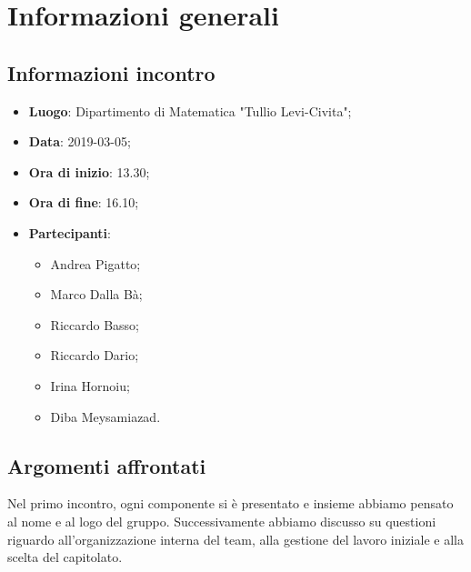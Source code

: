 \section{Informazioni generali}

\subsection{Informazioni incontro}
\begin{itemize}
\item \textbf{Luogo}: Dipartimento di Matematica "Tullio Levi-Civita";
\item \textbf{Data}: 2019-03-05;
\item \textbf{Ora di inizio}: 13.30;
\item \textbf{Ora di fine}: 16.10;
\item \textbf{Partecipanti}: 
\begin{itemize}
	\item Andrea Pigatto;
	\item Marco Dalla Bà;
	\item Riccardo Basso;
	\item Riccardo Dario;
	\item Irina Hornoiu;
	\item Diba Meysamiazad.
\end{itemize}
\end{itemize}

\subsection{Argomenti affrontati}
Nel primo incontro, ogni componente si è presentato e insieme abbiamo pensato al nome e al logo del gruppo. 
Successivamente abbiamo discusso su questioni riguardo all'organizzazione interna del team, alla gestione del lavoro iniziale e alla scelta del 
capitolato\glo.
